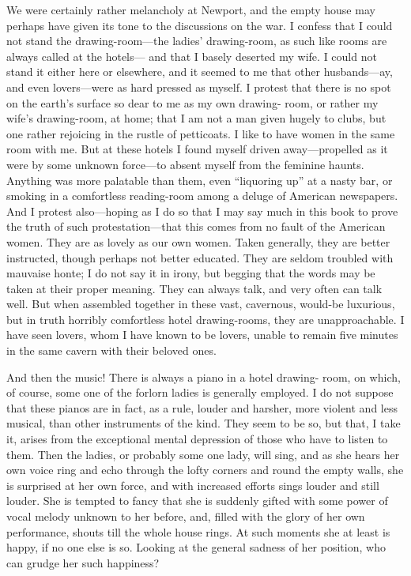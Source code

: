 We were certainly rather melancholy at Newport, and the empty house
may perhaps have given its tone to the discussions on the war.  I
confess that I could not stand the drawing-room---the ladies'
drawing-room, as such like rooms are always called at the hotels---%
and that I basely deserted my wife.  I could not stand it either
here or elsewhere, and it seemed to me that other husbands---ay, and
even lovers---were as hard pressed as myself.  I protest that there
is no spot on the earth's surface so dear to me as my own drawing-
room, or rather my wife's drawing-room, at home; that I am not a
man given hugely to clubs, but one rather rejoicing in the rustle
of petticoats.  I like to have women in the same room with me.  But
at these hotels I found myself driven away---propelled as it were by
some unknown force---to absent myself from the feminine haunts.
Anything was more palatable than them, even ``liquoring up'' at a
nasty bar, or smoking in a comfortless reading-room among a deluge
of American newspapers.  And I protest also---hoping as I do so that
I may say much in this book to prove the truth of such
protestation---that this comes from no fault of the American women.
They are as lovely as our own women.  Taken generally, they are
better instructed, though perhaps not better educated.  They are
seldom troubled with mauvaise honte; I do not say it in irony, but
begging that the words may be taken at their proper meaning.  They
can always talk, and very often can talk well.  But when assembled
together in these vast, cavernous, would-be luxurious, but in truth
horribly comfortless hotel drawing-rooms, they are unapproachable.
I have seen lovers, whom I have known to be lovers, unable to
remain five minutes in the same cavern with their beloved ones.

And then the music!  There is always a piano in a hotel drawing-
room, on which, of course, some one of the forlorn ladies is
generally employed.  I do not suppose that these pianos are in
fact, as a rule, louder and harsher, more violent and less musical,
than other instruments of the kind.  They seem to be so, but that,
I take it, arises from the exceptional mental depression of those
who have to listen to them.  Then the ladies, or probably some one
lady, will sing, and as she hears her own voice ring and echo
through the lofty corners and round the empty walls, she is
surprised at her own force, and with increased efforts sings louder
and still louder.  She is tempted to fancy that she is suddenly
gifted with some power of vocal melody unknown to her before, and,
filled with the glory of her own performance, shouts till the whole
house rings.  At such moments she at least is happy, if no one else
is so.  Looking at the general sadness of her position, who can
grudge her such happiness?

